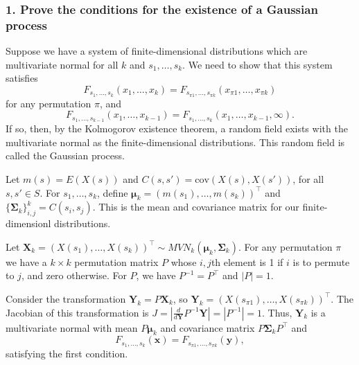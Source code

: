 \documentclass[12pt]{article}
\newcommand{\m}[1]{\mathbf{\bm{#1}}}
\begin{document}
\subsubsection*{1. Prove the conditions for the existence of a Gaussian process}

Suppose we have a system of finite-dimensional distributions which are multivariate normal for all $k$ and $s_1,\ldots,s_k$. We need to show that this system satisfies
\[ F_{s_1,\ldots,s_k}(x_1,\ldots,x_k)=F_{s_{\pi 1},\ldots,s_{\pi k}}(x_{\pi 1},\ldots,x_{\pi k}) \]
for any permutation $\pi$, and
\[ F_{s_1,\ldots,s_{k-1}}(x_1,\ldots,x_{k-1})=F_{s_1,\ldots,s_k}(x_1,\ldots,x_{k-1},\infty). \]
If so, then, by the Kolmogorov existence theorem, a random field exists with the multivariate normal as the finite-dimensional distributions. This random field is called the Gaussian process.
\bigskip

Let $m(s)=E(X(s))$ and $C(s,s')=\mathrm{cov}(X(s),X(s'))$, for all $s,s'\in S$. For $s_1,\ldots,s_k$, define $\m{\mu}_k=(m(s_1),\ldots,m(s_k))^\top$ and $\{\m{\Sigma}_k\}_{i,j}^k=C(s_i,s_j)$. This is the mean and covariance matrix for our finite-dimensionl distributions.
\bigskip

Let $\m{X}_k=(X(s_1),\ldots,X(s_k))^\top\sim MVN_k\left(\m{\mu}_k,\m{\Sigma}_k\right)$. For any permutation $\pi$ we have a $k\times k$ permutation matrix $P$ whose $i,j$th element is 1 if $i$ is to permute to $j$, and zero otherwise. For $P$, we have $P^{-1}=P^\top$ and $|P|=1$.
\bigskip

Consider the transformation $\m{Y}_k=P\m{X}_k$, so $\m{Y}_k=(X(s_{\pi 1}),\ldots,X(s_{\pi k}))^\top$. The Jacobian of this transformation is $J=|\frac{d}{d \m{Y}} P^{-1}\m{Y}|=|P^{-1}|=1$. Thus, $\m{Y}_k$ is a multivariate normal with mean $P\m{\mu}_k$ and covariance matrix $P\m{\Sigma}_kP^\top$ and
\[ F_{s_1,\ldots,s_k}(\m{x}) = F_{s_{\pi 1},\ldots, s_{\pi k}}(\m{y}), \]
satisfying the first condition.
\bigskip
\end{document}
